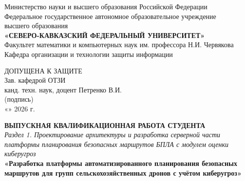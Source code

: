 \documentclass[14pt,a4paper]{extarticle}
\begin{document}
\begin{titlepage}
\begin{center}
Министерство науки и высшего образования Российской Федерации\\
Федеральное государственное автономное образовательное учреждение\\
высшего образования\\
\textbf{«СЕВЕРО-КАВКАЗСКИЙ ФЕДЕРАЛЬНЫЙ УНИВЕРСИТЕТ»}\\[0.3cm]
Факультет математики и компьютерных наук им. профессора Н.И. Червякова\\
Кафедра организации и технологии защиты информации
\end{center}

\vspace{0.5cm}

\begin{flushright}
\begin{minipage}{0.48\textwidth}
ДОПУЩЕНА К ЗАЩИТЕ\\[0.2cm]
Зав. кафедрой ОТЗИ\\
канд. техн. наук, доцент Петренко В.И.\\[0.2cm]
\underline{\hspace{5cm}} \hfill (подпись)\\[0.1cm]
«\underline{\hspace{0.7cm}}» \underline{\hspace{2.5cm}} 2026 г.
\end{minipage}
\end{flushright}

\vspace{0.5cm}

\begin{center}
\textbf{ВЫПУСКНАЯ КВАЛИФИКАЦИОННАЯ РАБОТА СТУДЕНТА}\\[0.3cm]
\textit{Раздел 1. Проектирование архитектуры и разработка серверной части\\
платформы планирования безопасных маршрутов БПЛА с модулем оценки киберугроз}\\[0.5cm]
\textbf{«Разработка платформы автоматизированного планирования безопасных\\
маршрутов для групп сельскохозяйственных дронов с учётом киберугроз»}
\end{center}

\vspace{0.5cm}


\end{titlepage}
\end{document}
